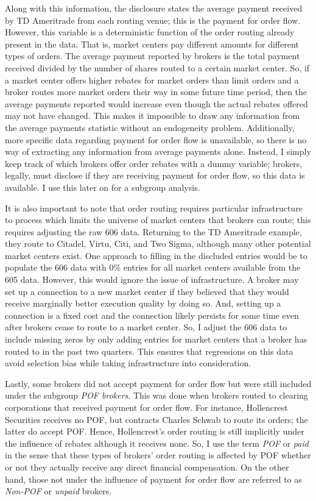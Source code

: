 \documentclass[12pt,a4paper]{extarticle}
\begin{document}
		Along with this information, the disclosure states the average payment received by TD Ameritrade from each routing venue; this is the payment for order flow. However, this variable is a deterministic function of the order routing already present in the data. That is, market centers pay different amounts for different types of orders. The average payment reported by brokers is the total payment received divided by the number of shares routed to a certain market center. So, if a market center offers higher rebates for market orders than limit orders and a broker routes more market orders their way in some future time period, then the average payments reported would increase even though the actual rebates offered may not have changed. This makes it impossible to draw any information from the average payments statistic without an endogeneity problem. Additionally, more specific data regarding payment for order flow is unavailable, so there is no way of extracting any information from average payments alone. Instead, I simply keep track of which brokers offer order rebates with a dummy variable; brokers, legally, must disclose if they are receiving payment for order flow, so this data is available. I use this later on for a subgroup analysis. 
		
		It is also important to note that order routing requires particular infrastructure to process which limits the universe of market centers that brokers can route; this requires adjusting the raw 606 data. Returning to the TD Ameritrade example, they route to Citadel, Virtu, Citi, and Two Sigma, although many other potential market centers exist. One approach to filling in the discluded entries would be to populate the 606 data with 0\% entries for all market centers available from the 605 data. However, this would ignore the issue of infrastructure. A broker may set up a connection to a new market center if they believed that they would receive marginally better execution quality by doing so. And, setting up a connection is a fixed cost and the connection likely persists for some time even after brokers cease to route to a market center. So, I adjust the 606 data to include missing zeros by only adding entries for market centers that a broker has routed to in the past two quarters. This ensures that regressions on this data avoid selection bias while taking infrastructure into consideration. 
		
		Lastly, some brokers did not accept payment for order flow but were still included under the subgroup \textit{POF brokers}. This was done when brokers routed to clearing corporations that received payment for order flow. For instance, Hollencrest Securities receives no POF, but contracts Charles Schwab to route its orders; the latter do accept POF. Hence, Hollencrest's order routing is still implicitly under the influence of rebates although it receives none. So, I use the term \textit{POF} or \textit{paid} in the sense that these types of brokers' order routing is affected by POF whether or not they actually receive any direct financial compensation. On the other hand, those not under the influence of payment for order flow are referred to as \textit{Non-POF} or \textit{unpaid} brokers. 
		
\end{document}
